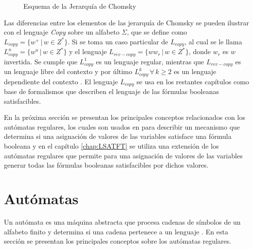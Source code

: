 \begin{figure}
  \centering
  \caption{Esquema de la Jerarquía de Chomsky}
  \label{fig:ChomskySchema} %
\end{figure}

Las diferencias entre los elementos de las jerarquía de Chomsky se pueden ilustrar con el lenguaje \textit{Copy} sobre un alfabeto 
$\Sigma$, que se define como $L_{copy}=\{w^+\,|\,w\in Z^*\}$.  
Si se toma un caso particular de $L_{copy}$, al cual se le llama $L_{copy}^n=\{w^n\,|\,w\in Z^*\}$ y 
el lenguaje $L_{rev-copy}=\{ww_r\,|\,w\in Z^*\}$, donde $w_r$ es $w$ invertida. Se cumple que $L_{copy}^1$
es un lenguaje regular, mientras que $L_{rev-copy}$ es un lenguaje libre del contexto y por último 
$L_{copy}^k\,\forall\,k\geq 2$ es un lenguaje dependiente del contexto \cite{authomataTheory}.  
El lenguaje $L_{copy}$ se usa en los restantes capítulos como base de formalismos que describen el 
lenguaje de las fórmulas booleanas satisfacibles.

En la próxima sección se presentan los principales conceptos relacionados con los autómatas regulares,
los cuales son usados en \cite{aCFSAT} para describir un mecanismo que determina si una asignación
de valores de las variables satisface una fórmula booleana y en el capítulo \ref{chap:LSATFT} se utiliza una extensión
de los autómatas regulares que permite para una asignación de valores de las variables generar todas las fórmulas
booleanas satisfacibles por dichos valores.

\section{Autómatas}
Un autómata es una máquina abstracta que procesa cadenas de símbolos de un alfabeto finito y determina si una 
cadena pertenece a un lenguaje \cite{authomataTheory}.  En esta sección se presentan los 
principales conceptos sobre los autómatas regulares.
